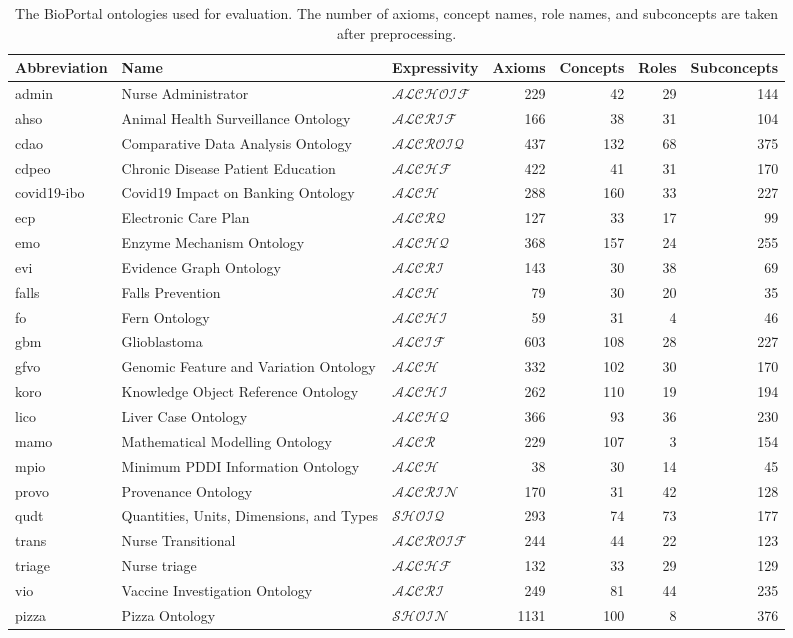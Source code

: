 \documentclass[
]{ceurart}
\begin{document}
\begin{table}
  \centering
  \scriptsize
  \begin{tabular}{|lllrrrr|}
    \hline
    Abbreviation & Name & Expressivity & Axioms & Concepts & Roles & Subconcepts \\
    \hline
    admin & Nurse Administrator & $\mathcal{ALCHOIF}$ & 229 & 42 & 29 & 144 \\
    ahso & Animal Health Surveillance Ontology & $\mathcal{ALCRIF}$ & 166 & 38 & 31 & 104 \\
    cdao & Comparative Data Analysis Ontology & $\mathcal{ALCROIQ}$ & 437 & 132 & 68 & 375 \\
    cdpeo & Chronic Disease Patient Education & $\mathcal{ALCHF}$ & 422 & 41 & 31 & 170 \\
    covid19-ibo & Covid19 Impact on Banking Ontology & $\mathcal{ALCH}$ & 288 & 160 & 33 & 227 \\
    ecp & Electronic Care Plan & $\mathcal{ALCRQ}$ & 127 & 33 & 17 & 99 \\
    emo & Enzyme Mechanism Ontology & $\mathcal{ALCHQ}$ & 368 & 157 & 24 & 255 \\
    evi & Evidence Graph Ontology & $\mathcal{ALCRI}$ & 143 & 30 & 38 & 69 \\
    falls & Falls Prevention & $\mathcal{ALCH}$ & 79 & 30 & 20 & 35 \\
    fo & Fern Ontology & $\mathcal{ALCHI}$ & 59 & 31 & 4 & 46 \\
    gbm & Glioblastoma & $\mathcal{ALCIF}$ & 603 & 108 & 28 & 227 \\
    gfvo & Genomic Feature and Variation Ontology & $\mathcal{ALCH}$ & 332 & 102 & 30 & 170 \\
    koro & Knowledge Object Reference Ontology & $\mathcal{ALCHI}$ & 262 & 110 & 19 & 194 \\
    lico & Liver Case Ontology & $\mathcal{ALCHQ}$ & 366 & 93 & 36 & 230 \\
    mamo & Mathematical Modelling Ontology & $\mathcal{ALCR}$ & 229 & 107 & 3 & 154 \\
    mpio & Minimum PDDI Information Ontology & $\mathcal{ALCH}$ & 38 & 30 & 14 & 45 \\
    provo & Provenance Ontology & $\mathcal{ALCRIN}$ & 170 & 31 & 42 & 128 \\
    qudt & Quantities, Units, Dimensions, and Types & $\mathcal{SHOIQ}$ & 293 & 74 & 73 & 177 \\
    trans & Nurse Transitional & $\mathcal{ALCROIF}$ & 244 & 44 & 22 & 123 \\
    triage & Nurse triage & $\mathcal{ALCHF}$ & 132 & 33 & 29 & 129 \\
    vio & Vaccine Investigation Ontology & $\mathcal{ALCRI}$ & 249 & 81 & 44 & 235 \\
    pizza & Pizza Ontology & $\mathcal{SHOIN}$ & 1131 & 100 & 8 & 376 \\
    \hline
  \end{tabular}
  \caption{The BioPortal ontologies used for evaluation. The number of axioms, concept names, role names, and subconcepts are taken after preprocessing.}
	\label{table:ontologies}
\end{table}
\end{document}
